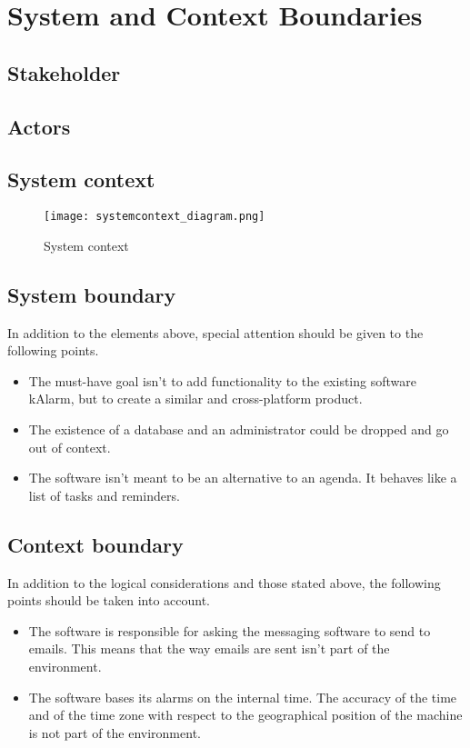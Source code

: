 \chapter{System and Context Boundaries}

\section{Stakeholder}


\section{Actors}


\newpage
\section{System context}
\begin{figure}[h]
	\centering
	\caption{System context}
	\texttt{[image: systemcontext\_diagram.png]}
\end{figure}

\section{System boundary}
In addition to the elements above, special attention should be given to the following points.
\begin{itemize}
	\item The must-have goal isn't to add functionality to the existing software kAlarm, but to create a similar and cross-platform product.
	\item The existence of a database and an administrator could be dropped and go out of context.
	\item The software isn't meant to be an alternative to an agenda. It behaves like a list of tasks and reminders.
\end{itemize}

\section{Context boundary}
In addition to the logical considerations and those stated above, the following points should be taken into account.
\begin{itemize}
	\item The software is responsible for asking the messaging software to send to emails. This means that the way emails are sent isn't part of the environment.
	\item The software bases its alarms on the internal time. The accuracy of the time and of the time zone with respect to the geographical position of the machine is not part of the environment.
\end{itemize}